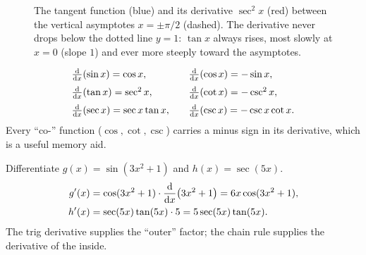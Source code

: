 \begin{figure}[htbp]
\centering
{}
\caption{The tangent function (blue) and its derivative $\sec^2 x$ (red) between
the vertical asymptotes $x=\pm\pi/2$ (dashed). The derivative never drops below
the dotted line $y=1$: $\tan x$ always rises, most slowly at $x=0$ (slope $1$)
and ever more steeply toward the asymptotes.}
\label{ch12:fig-tan}
\end{figure}

\begin{focusbox}
\[
\begin{array}{ll}
\frac{\mathrm{d}}{\mathrm{d} x}\!\left(\sin x\right) = \cos x, &\quad \frac{\mathrm{d}}{\mathrm{d} x}\!\left(\cos x\right) = -\sin x, \\[6pt]
\frac{\mathrm{d}}{\mathrm{d} x}\!\left(\tan x\right) = \sec^2 x, &\quad \frac{\mathrm{d}}{\mathrm{d} x}\!\left(\cot x\right) = -\csc^2 x, \\[6pt]
\frac{\mathrm{d}}{\mathrm{d} x}\!\left(\sec x\right) = \sec x\tan x, &\quad \frac{\mathrm{d}}{\mathrm{d} x}\!\left(\csc x\right) = -\csc x\cot x.
\end{array}
\]
Every ``co-'' function ($\cos,\cot,\csc$) carries a minus
sign in its derivative, which is a useful memory aid.
\end{focusbox}

\begin{example}
\label{ch12:ex-chain-trig}
Differentiate $g(x) = \sin(3x^2+1)$ and $h(x)=\sec(5x)$.
\begin{align*}
   g'(x) &= \cos(3x^2+1)\cdot \frac{\mathrm{d}}{\mathrm{d} x}\!\left(3x^2+1\right) = 6x\cos(3x^2+1),\\
   h'(x) &= \sec(5x)\tan(5x)\cdot 5 = 5\sec(5x)\tan(5x).
\end{align*}
The trig derivative supplies the ``outer'' factor; the chain rule supplies
the derivative of the inside.
\end{example}

